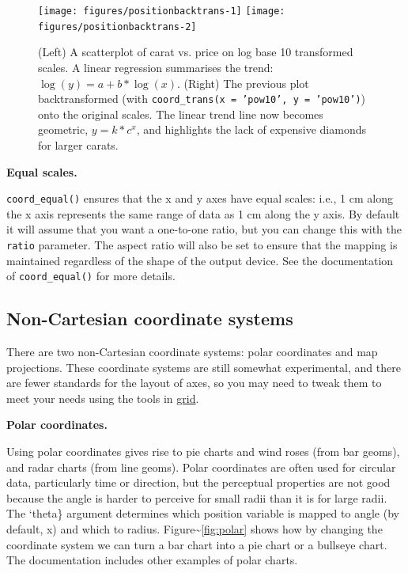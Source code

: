 \begin{figure}
\texttt{[image: figures/positionbacktrans-1]} \texttt{[image: figures/positionbacktrans-2]} \caption{(Left) A scatterplot of carat vs. price on log base 10 transformed scales.  A linear regression summarises the trend: $\log(y) = a + b * \log(x)$.  (Right) The previous plot backtransformed (with \texttt{coord\_trans(x = 'pow10', y = 'pow10')}) onto the original scales.  The linear trend line now becomes geometric, $y = k * c^x$, and highlights the lack of expensive diamonds for larger carats.\label{fig:backtrans}}
\end{figure}

\textbf{Equal scales.}

\texttt{coord\_equal()} ensures that the x and y axes have equal scales:
i.e., 1 cm along the x axis represents the same range of data as 1 cm
along the y axis. By default it will assume that you want a one-to-one
ratio, but you can change this with the \texttt{ratio} parameter. The
aspect ratio will also be set to ensure that the mapping is maintained
regardless of the shape of the output device. See the documentation of
\texttt{coord\_equal()} for more details. 
 

\subsection{Non-Cartesian coordinate systems}

There are two non-Cartesian coordinate systems: polar coordinates and
map projections. These coordinate systems are still somewhat
experimental, and there are fewer standards for the layout of axes, so
you may need to tweak them to meet your needs using the tools in
\hyperref[cha:grid]{grid}. 

\textbf{Polar coordinates.}

Using polar coordinates gives rise to pie charts and wind roses (from
bar geoms), and radar charts (from line geoms). Polar coordinates are
often used for circular data, particularly time or direction, but the
perceptual properties are not good because the angle is harder to
perceive for small radii than it is for large radii. The `theta\}
argument determines which position variable is mapped to angle (by
default, x) and which to radius. Figure\textasciitilde{}\ref{fig:polar}
shows how by changing the coordinate system we can turn a bar chart into
a pie chart or a bullseye chart. The documentation includes other
examples of polar charts. 
 

